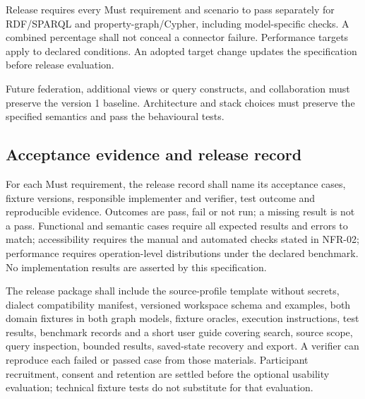 \documentclass[11pt,a4paper]{article}
\begin{document}
Release requires every Must requirement and scenario to pass separately for RDF/SPARQL and property-graph/Cypher, including model-specific checks. A combined percentage shall not conceal a connector failure. Performance targets apply to declared conditions. An adopted target change updates the specification before release evaluation.

Future federation, additional views or query constructs, and collaboration must preserve the version 1 baseline. Architecture and stack choices must preserve the specified semantics and pass the behavioural tests.

\subsection{Acceptance evidence and release record}
For each Must requirement, the release record shall name its acceptance cases, fixture versions, responsible implementer and verifier, test outcome and reproducible evidence. Outcomes are pass, fail or not run; a missing result is not a pass. Functional and semantic cases require all expected results and errors to match; accessibility requires the manual and automated checks stated in NFR-02; performance requires operation-level distributions under the declared benchmark. No implementation results are asserted by this specification.

The release package shall include the source-profile template without secrets, dialect compatibility manifest, versioned workspace schema and examples, both domain fixtures in both graph models, fixture oracles, execution instructions, test results, benchmark records and a short user guide covering search, source scope, query inspection, bounded results, saved-state recovery and export. A verifier can reproduce each failed or passed case from those materials. Participant recruitment, consent and retention are settled before the optional usability evaluation; technical fixture tests do not substitute for that evaluation.
\end{document}
